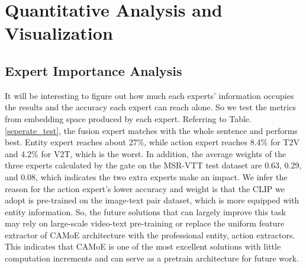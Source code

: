 \documentclass[letterpaper]{article} \usepackage{aaai22}  \usepackage{times}  \usepackage{helvet}  \usepackage{courier}  \usepackage[hyphens]{url}  \usepackage{graphicx} \urlstyle{rm} \def\UrlFont{\rm}  \usepackage{natbib}  \usepackage{caption}
\begin{document}
\section{Quantitative Analysis and Visualization}

\subsection{Expert Importance Analysis}
It will be interesting to figure out how much each experts' information occupies the results and the accuracy each expert can reach alone. So we test the metrics from embedding space produced by each expert. Referring to Table.\ref{seperate_test}, the fusion expert matches with the whole sentence and performs best. Entity expert reaches about 27\%, while action expert reaches 8.4\% for T2V and 4.2\% for V2T, which is the worst. In addition, the average weights of the three experts calculated by the gate on the MSR-VTT test dataset are 0.63, 0.29, and 0.08, which indicates the two extra experts make an impact. We infer the reason for the action expert's lower accuracy and weight is that the CLIP we adopt is pre-trained on the image-text pair dataset, which is more equipped with entity information. So, the future solutions that can largely improve this task may rely on large-scale video-text pre-training or replace the uniform feature extractor of CAMoE architecture with the professional entity, action extractors. This indicates that CAMoE is one of the most excellent solutions with little computation increments and can serve as a pretrain architecture for future work.


\begin{table}[h]
\centering
\caption{Separate test for each Expert.}
\label{seperate_test}
\end{table}
\end{document}
